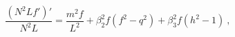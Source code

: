 \begin{equation}
\frac{(N^2Lf')'}{N^2L}=\frac{m^2f}{L^2}+\beta_2^2f(f^2-q^2)+\beta_3^2
f(h^2-1) \  ,
\label{eqf}
\end{equation}

